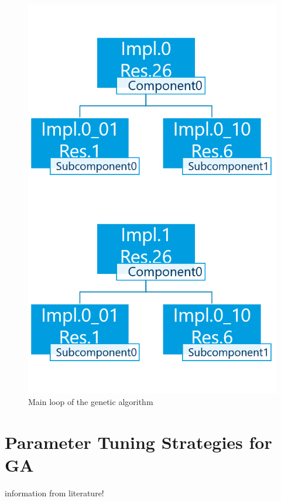 \begin{figure}
	\centering
	\includegraphics[width=\textwidth]{images/GeneticSolverMutation.png}
	\caption{Main loop of the genetic algorithm}
	\label{fig:GeneticSolverMutation}
\end{figure}

\section{Parameter Tuning Strategies for GA}
information from literature!

